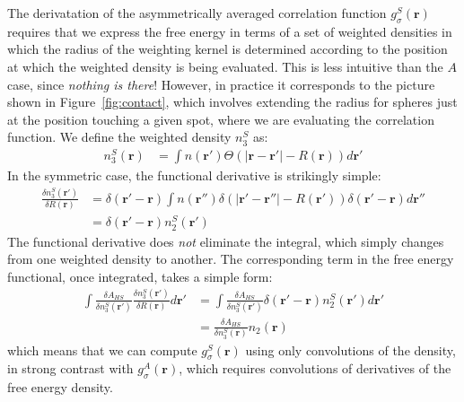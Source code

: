 \documentclass[letterpaper,twocolumn,amsmath,amssymb,jcp,10pt,aip]{revtex4-1}
\newcommand{\rr}{\textbf{r}}
\begin{document}
\begin{widetext}
The derivatation of the asymmetrically averaged correlation function
$g_\sigma^S(\rr)$ requires that we express the free energy in terms of
a set of weighted densities in which the radius of the weighting
kernel is determined according to the position at which the weighted
density is being evaluated.  This is less intuitive than the $A$ case,
since \emph{nothing is there}!  However, in practice it corresponds to
the picture shown in Figure~\ref{fig:contact}, which involves
extending the radius for spheres just at the position touching a
given spot, where we are evaluating the correlation function.  We
define the weighted density $n_3^S$ as:
\begin{align}
  n_3^{S}(\rr) &= \int n(\rr') \Theta(\left|\rr - \rr'\right| -R(\rr)) d\rr'
\end{align}
In the symmetric case, the functional derivative is strikingly simple:
\begin{align}
  \frac{\delta n_3^{S} (\rr')}{\delta R(\rr)} &=
   \delta(\rr'-\rr) \int n (\rr'') \delta(|\rr' - \rr''| - R(\rr'))
   \delta(\rr'-\rr) d\rr''
   \\
   &= \delta(\rr'-\rr) n_2^S(\rr')
\end{align}
The functional derivative does \emph{not} eliminate the integral,
which simply changes from one weighted density to another.  The
corresponding term in the free energy functional, once integrated,
takes a simple form:
\begin{align}
  \int \frac{\delta A_{HS}}{\delta n_3^{S}(\rr')}
  \frac{\delta n_3^{S}(\rr')}{\delta R(\rr)} d\rr'
  &= \int \frac{\delta A_{HS}}{\delta n_3^{S}(\rr')} \delta(\rr'-\rr)
  n_2^S(\rr') d\rr' \\
  &= \frac{\delta A_{HS}}{\delta n_3^{S}(\rr)} n_2(\rr)
\end{align}
which means that we can compute $g_\sigma^S(\rr)$ using only
convolutions of the density, in strong contrast with
$g_\sigma^A(\rr)$, which requires convolutions of derivatives of the
free energy density.


\end{widetext}
\end{document}
